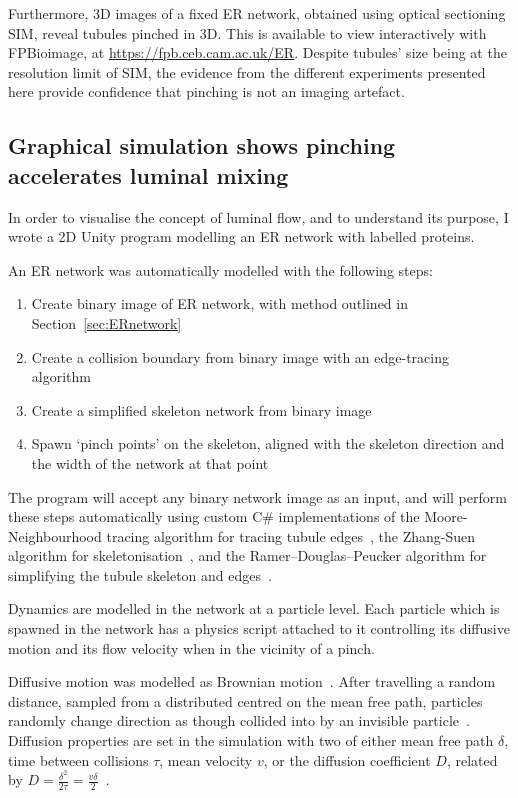 Furthermore, 3D images of a fixed ER network, obtained using optical sectioning SIM, reveal tubules pinched in 3D. 
This is available to view interactively with FPBioimage, at \url{https://fpb.ceb.cam.ac.uk/ER}. 
Despite tubules' size being at the resolution limit of SIM, the evidence from the different experiments presented here provide confidence that pinching is not an imaging artefact. 

\newpage
\subsection{Graphical simulation shows pinching accelerates luminal mixing}
In order to visualise the concept of luminal flow, and to understand its purpose, I wrote a 2D Unity program modelling an ER network with labelled proteins. 

An ER network was automatically modelled with the following steps:
\begin{enumerate}
	\item Create binary image of ER network, with method outlined in Section~\ref{sec:ERnetwork}
	\item Create a collision boundary from binary image with an edge-tracing algorithm
	\item Create a simplified skeleton network from binary image
	\item Spawn `pinch points' on the skeleton, aligned with the skeleton direction and the width of the network at that point
\end{enumerate}
The program will accept any binary network image as an input, and will perform these steps automatically using custom C\# implementations of the Moore-Neighbourhood tracing algorithm for tracing tubule edges~\cite{moore-neighbourhood}, the Zhang-Suen algorithm for skeletonisation~\cite{zhang1984fast}, and the Ramer–Douglas–Peucker algorithm for simplifying the tubule skeleton and edges~\cite{ramer1972iterative, douglas1973algorithms}. 

Dynamics are modelled in the network at a particle level. 
Each particle which is spawned in the network has a physics script attached to it controlling its diffusive motion and its flow velocity when in the vicinity of a pinch. 

Diffusive motion was modelled as Brownian motion~\cite{einstein1905molekularkinetischen}.
After travelling a random distance, sampled from a distributed centred on the mean free path, particles randomly change direction as though collided into by an invisible particle~\cite{lucretius1631}. 
Diffusion properties are set in the simulation with two of either mean free path $\delta$, time between collisions $\tau$, mean velocity $v$, or the diffusion coefficient $D$, related by $D=\frac{\delta^2}{2\tau}=\frac{v\delta}{2}$~\cite[\textit{ch. 19}]{fishbane1998physics}. 

